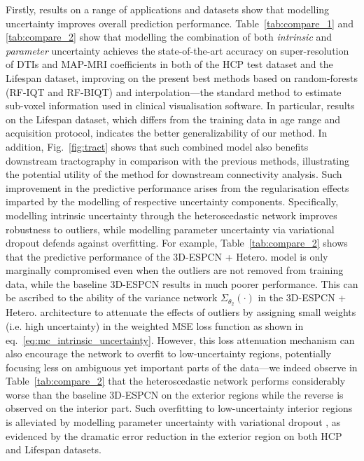 Firstly, results on a range of applications and datasets show that modelling uncertainty improves overall prediction performance. Table~\ref{tab:compare_1} and \ref{tab:compare_2} show that modelling the combination of both \textit{intrinsic} and \textit{parameter} uncertainty achieves the state-of-the-art accuracy on super-resolution of DTIs and MAP-MRI coefficients in both of the HCP test dataset and the Lifespan dataset, improving on the present best methods based on random-forests (RF-IQT\cite{alexander2017image} and RF-BIQT\cite{tanno2016bayesian}) and interpolation---the standard method to estimate sub-voxel information used in clinical visualisation software. In particular, results on the Lifespan dataset, which differs from the training data in age range and acquisition protocol, indicates the better generalizability of our method. In addition, Fig.~\ref{fig:tract} shows that such combined model also benefits downstream tractography in comparison with the previous methods, illustrating the potential utility of the method for downstream connectivity analysis. Such improvement in the predictive performance arises from the regularisation effects imparted by the modelling of respective uncertainty components. Specifically, modelling intrinsic uncertainty through the heteroscedastic network improves robustness to outliers, while modelling parameter uncertainty via variational dropout defends against overfitting. For example,  Table~\ref{tab:compare_2} shows that the predictive performance of the 3D-ESPCN + Hetero. model is only marginally compromised even when the outliers are not removed from training data, while the baseline 3D-ESPCN results in much poorer performance. This can be ascribed to the ability of the variance network $\Sigma_{\theta_2}(\cdot)$ in the 3D-ESPCN + Hetero. architecture to attenuate the effects of outliers by assigning small weights (i.e. high uncertainty) in the weighted MSE loss function as shown in eq.~\eqref{eq:mc_intrinsic_uncertainty}. However, this loss attenuation mechanism can also encourage the network to overfit to low-uncertainty regions, potentially focusing less on ambiguous yet important parts of the data---we indeed observe in Table~\ref{tab:compare_2}  that the heteroscedastic network performs considerably worse than the baseline 3D-ESPCN on the exterior regions while the reverse is observed on the interior part. Such overfitting to low-uncertainty interior regions is alleviated by modelling parameter uncertainty with variational dropout \cite{kingma2015variational}, as evidenced by the dramatic error reduction in the exterior region on both HCP and Lifespan datasets. 

